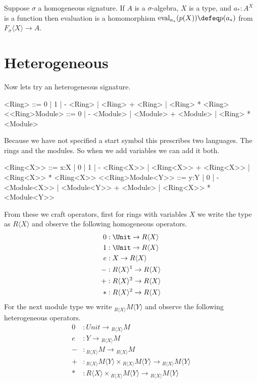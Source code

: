 \begin{theorem}
    Suppose $\sigma$ a homogeneous signature.
    If $A$ is a $\sigma$-algebra, $X$ is a type, and $a_*:A^X$ is a function 
    then evaluation is a homomorphism $\text{eval}_{a_*}(p(X))\defeq p(a_*)$ 
    from $F_{\sigma}\langle X\rangle\to A$.
\end{theorem}


\section{Heterogeneous}

Now lets try an heterogeneous signature.
\begin{center}
\begin{Gcode}[]
<Ring> ::= 0 
         | 1
         | - <Ring>
         | <Ring> + <Ring>
         | <Ring> * <Ring>
<<Ring>Module> ::= 0
           | - <Module>
           | <Module> + <Module>
           | <Ring> * <Module>
\end{Gcode}
\end{center}
Because we have not specified a start symbol this prescribes two languages.
The rings and the modules.  So when we add variables we can add it both.
\begin{center}
\begin{Gcode}[]
<Ring<X>> ::= x:X
            | 0 
            | 1
            | - <Ring<X>>
            | <Ring<X>> + <Ring<X>>
            | <Ring<X>> * <Ring<X>>
<<Ring>Module<Y>> ::= y:Y
            | 0
            | - <Module<X>>
            | <Module<Y>> + <Module>
            | <Ring<X>> * <Module<Y>>
\end{Gcode}
\end{center}
    
From these we craft operators, first for rings with variables $X$ we 
write the type as $R\langle X\rangle$ and observe the following homogeneous operators.
\begin{align*}
    0&:\Unit\to R\langle X\rangle \\
    1&:\Unit\to R\langle X\rangle \\    
    e& :X\to R\langle X\rangle\\
    -&: R\langle X\rangle^1\to R\langle X\rangle\\
    +&:R\langle X\rangle^2\to R\langle X\rangle\\
    *&:R\langle X\rangle^2 \to R\langle X\rangle
\end{align*}    
For the next module type we write ${_{R\langle X\rangle} M}\langle Y\rangle$ and observe the 
following heterogeneous operators.
\begin{align*}
    0&:Unit\to {_{R\langle X\rangle} M} \\
    e& :Y\to {_{R\langle X\rangle} M}\\
    -&: {_{R\langle X\rangle} M}\to  {_{R\langle X\rangle} M}\\
    +&:{_{R\langle X\rangle} M}\langle Y\rangle\times {_{R\langle X\rangle} M}\langle Y\rangle\to 
    {_{R\langle X\rangle} M}\langle Y\rangle\\
    *&:R\langle X\rangle\times {_{R\langle X\rangle} M}\langle Y\rangle\to 
    {_{R\langle X\rangle} M}\langle Y\rangle    
\end{align*}

